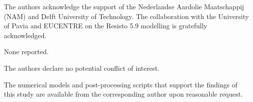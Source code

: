 \documentclass[AMA,twocolumn]{USG} %
\begin{document}
The authors acknowledge the support of the Nederlandse Aardolie Maatschappij (NAM) and Delft University of Technology. The collaboration with the University of Pavia and EUCENTRE on the Resisto 5.9 modelling is gratefully acknowledged.
 
None reported.
 
The authors declare no potential conflict of interest.
 
The numerical models and post-processing scripts that support the findings of this study are available from the corresponding author upon reasonable request.

\end{document}
